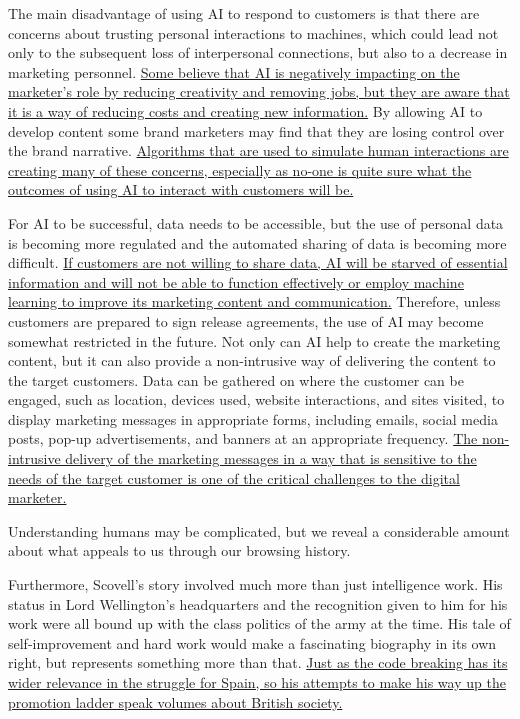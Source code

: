The main disadvantage of using AI to respond to customers is that there are concerns about trusting personal interactions to machines, which could lead not only to the subsequent loss of interpersonal connections, but also to a decrease in marketing personnel. \transnum  \uline{  Some believe that AI is negatively impacting on the marketer's role by reducing creativity and removing jobs, but they are aware that it is a way of reducing costs and creating new information.} By allowing AI to develop content some brand marketers may find that they are losing control over the brand narrative. \transnum  \uline{ Algorithms that are used to simulate human interactions are creating many of these concerns, especially as no-one is quite sure what the outcomes of using AI to interact with customers will be.}

For AI to be successful, data needs to be accessible, but the use of personal data is becoming more regulated and the automated sharing of data is becoming more difficult. \transnum  \uline{  If customers are not willing to share data, AI will be starved of essential information and will not be able to function effectively or employ machine learning to improve its marketing content and communication.} Therefore, unless customers are prepared to sign release agreements, the use of AI may become somewhat restricted in the future. Not only can AI help to create the marketing content, but it can also provide a non-intrusive way of delivering the content to the target customers. Data can be gathered on where the customer can be engaged, such as location, devices used, website interactions, and sites visited, to display marketing messages in appropriate forms, including emails, social media posts, pop-up advertisements, and banners at an appropriate frequency. \transnum  \uline{The non-intrusive delivery of the marketing messages in a way that is sensitive to the needs of the target customer is one of the critical challenges to the digital marketer.}

Understanding humans may be complicated, but we reveal a considerable amount about what appeals to us through our browsing history.

Furthermore, Scovell's story involved much more than just intelligence
work. His status in Lord Wellington's
headquarters and the recognition given to him for his work were all
bound up with the class politics of the army at
the time. His tale of self-improvement and hard work would make a
fascinating biography in its own right, but
represents something more than that. \transnum  \uline{Just as the code breaking has
its wider relevance in the struggle for
Spain, so his attempts to make his way up the promotion ladder speak
volumes about British society.}


